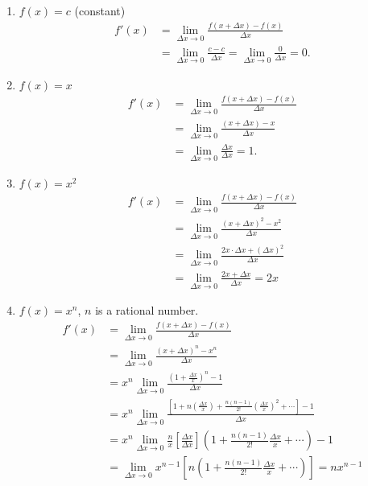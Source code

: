 \begin{enumerate}
    \item \( f(x) = c \) (constant)
        \begin{align*}
            f'(x) &= \lim_{\Delta x \to 0} \frac{f(x + \Delta x) - f(x)}{\Delta x} \\
                &= \lim_{\Delta x \to 0} \frac{c - c}{\Delta x} = \lim_{\Delta x \to 0} \frac{0}{\Delta x} = 0.
        \end{align*}
    \item \( f(x) = x \)
        \begin{align*}
            f'(x) &= \lim_{\Delta x \to 0} \frac{f(x + \Delta x) - f(x)}{\Delta x} \\
                &= \lim_{\Delta x \to 0} \frac{(x + \Delta x) - x}{\Delta x} \\
                &= \lim_{\Delta x \to 0} \frac{\Delta x}{\Delta x} = 1.
        \end{align*}

    \item \( f(x) = x^2 \)
        \begin{align*}
            f'(x) &= \lim_{\Delta x \to 0} \frac{f(x + \Delta x) - f(x)}{\Delta x}\\
            &= \lim_{\Delta x \to 0} \frac{(x + \Delta x)^2 - x^2}{\Delta x} \\
            &= \lim_{\Delta x \to 0} \frac{2x \cdot \Delta x + (\Delta x)^2}{\Delta x} \\
            &= \lim_{\Delta x \to 0} \frac{2x + \Delta x}{\Delta x} = 2x 
        \end{align*}


    \item $f(x) = x^n$, $n$ is a rational number.
        \begin{align*}
            f'(x) &= \lim_{\Delta x \to 0} \frac{f(x + \Delta x) - f(x)}{\Delta x} \\
            &= \lim_{\Delta x \to 0} \frac{(x + \Delta x)^n - x^n}{\Delta x} \\
            &= x^n \lim_{\Delta x \to 0} \frac{\left(1 + \frac{\Delta x}{x}\right)^n - 1}{\Delta x} \\
            &= x^n \lim_{\Delta x \to 0} \frac{ \left[ 1 + n \left(\frac{\Delta x}{x}\right) + \frac{n(n-1)}{2!} \left(\frac{\Delta x}{x}\right)^2 + \cdots \right] - 1}{\Delta x} \\
            &= x^n \lim_{\Delta x \to 0} \frac{n}{x} \left[ \frac{\Delta x}{\Delta x} \right] \left(1 + \frac{n(n - 1)}{2!}\frac{\Delta x}{x} + \cdots\right) - 1 \\
            &= \lim_{ \Delta x \to 0} x^{n - 1} \left[ n \left( 1 + \frac{n(n-1)}{2!}\frac{\Delta x}{x} + \cdots\right) \right] = nx^{n - 1}
        \end{align*}


\end{enumerate}
